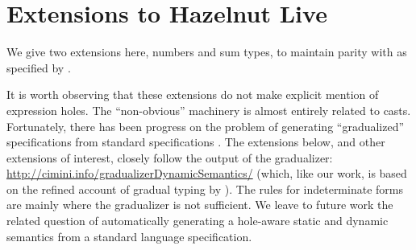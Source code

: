 \newcommand{\extensionsSec}{Extensions to Hazelnut Live}
\section{\protect\extensionsSec} %
\label{sec:extensions}

We give two extensions here, numbers and sum types, to maintain parity with \Hazelnut as specified by \citet{popl-paper}.

It is worth observing that these extensions do not make explicit mention of expression holes. The ``non-obvious'' machinery is almost entirely related to casts. Fortunately, there has been progress on the problem of generating ``gradualized'' specifications from standard specifications \cite{DBLP:conf/popl/CiminiS16,DBLP:conf/popl/CiminiS17}. The extensions below, and other extensions of interest, closely follow the output of the gradualizer: \url{http://cimini.info/gradualizerDynamicSemantics/} (which, like our work, is based on the refined account of gradual typing by \cite{DBLP:conf/snapl/SiekVCB15}). The rules for indeterminate forms are mainly where the gradualizer is not sufficient. We leave to future work the related question of automatically generating a hole-aware static and dynamic semantics from a standard language specification.


%





